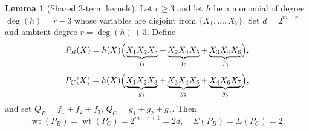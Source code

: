 \documentclass[conference]{IEEEtran}
\theoremstyle{definition}
\newtheorem{lemma}{Lemma}
\newtheorem{corollary}{Corollary}
\newcommand{\wt}{\operatorname{wt}}
\newcommand{\ind}{\operatorname{ind}}
\newcommand{\ev}{\operatorname{ev}}
\begin{document}






\begin{lemma}[Shared 3-term kernels]
\label{lem:shared-3term-weight}
Let $r\ge3$ and let $h$ be a monomial of degree $\deg(h)=r-3$ whose
variables are disjoint from $\{X_1,\dots,X_7\}$.  Set $d=2^{m-r}$ and
ambient degree $r=\deg(h)+3$. 
Define
\[
P_B(X)
  = h(X)\Bigl(
      \underbrace{X_1X_2X_3}_{f_1}
    + \underbrace{X_2X_4X_5}_{f_2}
    + \underbrace{X_3X_4X_6}_{f_3}
    \Bigr),
\]
\[
P_C(X)
  = h(X)\Bigl(
      \underbrace{X_1X_2X_3}_{g_1}
    + \underbrace{X_3X_4X_5}_{g_2}
    + \underbrace{X_4X_6X_7}_{g_3}
    \Bigr),
\]
and set $Q_B=f_1+f_2+f_3$, $Q_C=g_1+g_2+g_3$. Then
\[
\wt(P_B)=\wt(P_C)=2^{m-r+1}=2d,
\quad
\Sigma(P_B)=\Sigma(P_C)=2.
\]
\end{lemma}








\end{document}
